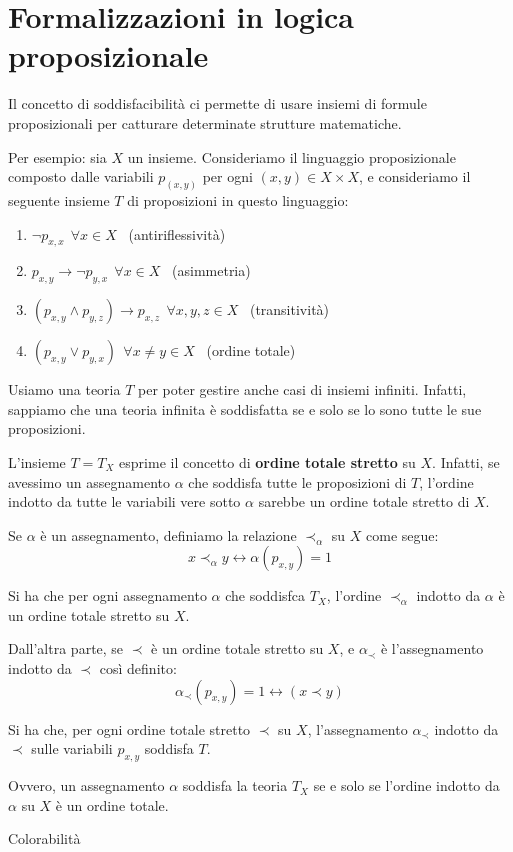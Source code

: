 \documentclass[a4paper,11pt]{report}
\begin{document}
\section{Formalizzazioni in logica proposizionale}

Il concetto di soddisfacibilità ci permette di usare insiemi di formule proposizionali per catturare determinate strutture matematiche.

Per esempio: sia \( X \) un insieme. Consideriamo il linguaggio proposizionale composto dalle variabili \(p_{(x, y)}  \) per ogni \( (x,y) \in X \times X\), e consideriamo il seguente insieme \( T \) di proposizioni in questo linguaggio:

\begin{enumerate}
    \item \( \neg p_{x,x} \ \ \forall x \in X\) \ {\color{gray}(antiriflessività)}
    \item \( p_{x, y} \to \neg p_{y,x} \ \   \forall x \in X\) \ {\color{gray}(asimmetria)}
    \item \( (p_{x, y} \land p_{y, z}) \to p_{x, z} \ \ \forall x, y, z \in X\) \ {\color{gray}(transitività)}
\item \( (p_{x, y} \lor p_{y, x}) \  \ \forall x \neq  y \in X\) \ {\color{gray}(ordine totale)}
\end{enumerate}

Usiamo una teoria \( T \) per poter gestire anche casi di insiemi infiniti. Infatti, sappiamo che una teoria infinita è soddisfatta se e solo se lo sono tutte le sue proposizioni.

L'insieme \( T = T_X \) esprime il concetto di \textbf{ordine totale stretto} su \( X \). Infatti, se avessimo un assegnamento \( \alpha \) che soddisfa tutte le proposizioni di \( T \), l'ordine indotto da tutte le variabili vere sotto \( \alpha \) sarebbe un ordine totale stretto di \( X  \).

Se \( \alpha \) è un assegnamento, definiamo la relazione \( \prec_{\alpha} \) su \( X \) come segue:
\[ x \prec_\alpha y \leftrightarrow \alpha(p_{x,y})=1 \]

Si ha che per ogni assegnamento \( \alpha \) che soddisfca \( T_X \), l'ordine \( \prec_\alpha \) indotto da \( \alpha \) è un ordine totale stretto su \( X \).

Dall'altra parte, se \( \prec \) è un ordine totale stretto su \( X \), e \( \alpha_\prec \) è l'assegnamento indotto da \( \prec \) così definito:
\[ \alpha_\prec (p_{x,y}) = 1 \leftrightarrow (x \prec y) \]

Si ha che, per ogni ordine totale stretto \( \prec \) su \(X \), l'assegnamento \( \alpha_\prec \) indotto da \( \prec \) sulle variabili \( p_{x, y} \) soddisfa \( T \).

Ovvero, un assegnamento \( \alpha \) soddisfa la teoria \( T_X \) se e solo se l'ordine indotto da \( \alpha \) su \( X \) è un ordine totale.

\begin{gbox}{Colorabilità}

\end{gbox}
\end{document}
